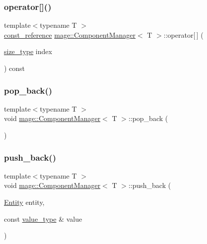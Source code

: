 \subsubsection{\texorpdfstring{operator[]()}{operator[]()}\hspace{0.1cm}{\footnotesize\ttfamily [2/2]}}
{\footnotesize\ttfamily template$<$typename T $>$ \\
\mbox{\hyperlink{classmage_1_1_component_manager_ae1b1c864f0dc2cd35c63e1084971b89c}{const\+\_\+reference}} \mbox{\hyperlink{classmage_1_1_component_manager}{mage\+::\+Component\+Manager}}$<$ T $>$\+::operator\mbox{[}$\,$\mbox{]} (\begin{DoxyParamCaption}\item[{\mbox{\hyperlink{classmage_1_1_component_manager_a6bd219525db9ec9f3adb9259e52674da}{size\+\_\+type}}}]{index }\end{DoxyParamCaption}) const\hspace{0.3cm}{\ttfamily [noexcept]}}

\mbox{\label{classmage_1_1_component_manager_a069077191e2be628be910aaa5250b5f1}} 
\subsubsection{\texorpdfstring{pop\+\_\+back()}{pop\_back()}}
{\footnotesize\ttfamily template$<$typename T $>$ \\
void \mbox{\hyperlink{classmage_1_1_component_manager}{mage\+::\+Component\+Manager}}$<$ T $>$\+::pop\+\_\+back (\begin{DoxyParamCaption}{ }\end{DoxyParamCaption})}

\mbox{\label{classmage_1_1_component_manager_aee2c65170dada47d99cec476b986b4c6}} 
\subsubsection{\texorpdfstring{push\+\_\+back()}{push\_back()}\hspace{0.1cm}{\footnotesize\ttfamily [1/2]}}
{\footnotesize\ttfamily template$<$typename T $>$ \\
void \mbox{\hyperlink{classmage_1_1_component_manager}{mage\+::\+Component\+Manager}}$<$ T $>$\+::push\+\_\+back (\begin{DoxyParamCaption}\item[{\mbox{\hyperlink{classmage_1_1_entity}{Entity}}}]{entity,  }\item[{const \mbox{\hyperlink{classmage_1_1_component_manager_a56aac3b52842bd8955253fa9b528a58d}{value\+\_\+type}} \&}]{value }\end{DoxyParamCaption})}

